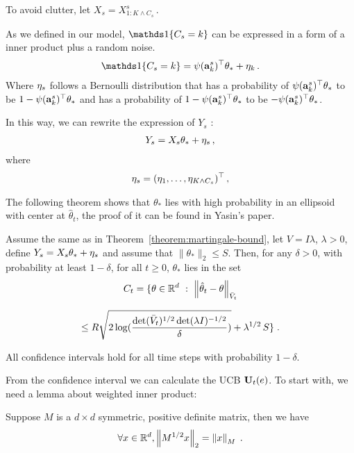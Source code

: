 To avoid clutter, let $X_s = X^s_{1 : K \wedge C_s}\,.$

As we defined in our model, $\I{C_s=k}$ can be expressed in a form of a inner product plus a random noise.
\begin{align*}
  \I{C_s=k} = \psi(\rnd{a}^s_k)^\top \theta_* + \rnd{\eta}_k \,.
\end{align*}
Where $ \mathbf{\eta}_s $ follows a Bernoulli distribution that
has a probability of $\psi(\mathbf{a}^s_k)^\top \theta_*$ to be $1 - \psi(\mathbf{a}^s_k)^\top \theta_*$
and has a probability of $1 - \psi(\mathbf{a}^s_k)^\top \theta_*$ to be $-\psi(\mathbf{a}^s_k)^\top \theta_*$.

In this way, we can rewrite the expression of $Y_s$ :
\begin{align*}
  Y_s = X_s \theta_* + \mathbf{\eta}_s \,,
\end{align*}
where
\begin{align*}
  \mathbf{\eta}_s = (\mathbf{\eta}_1, \dots, \mathbf{\eta}_{K \wedge C_s})^\top \,,
\end{align*}

The following theorem shows that $\theta_*$ lies with high probability in an
ellipsoid with center at $\hat{\theta}_t$, the proof of it can be found in Yasin's paper.

\begin{theorem}
\label{theorem:confidence-ellipsoid}
Assume the same as in Theorem~\ref{theorem:martingale-bound}, let $V = I \lambda$, $\lambda > 0$, define
$Y_s = X_s \theta_* + \mathbf{\eta}_s$ and assume that $\|\theta_*\|_2 \le S$. Then, for any $\delta > 0$, with probability at least $1-\delta$,
for all $t \ge 0$, $\theta_*$ lies in the set
$$
C_t = \{ \theta \in \mathbb{R}^d ~:~ \left\|\hat{\theta}_t -  \theta\right\|_{\bar{V}_{t}}
$$

$$
\le R \sqrt{2 \log( \frac{\det (\bar{V}_{t})^{1/2}\det(\lambda I)^{-1/2}}{\delta} )} + \lambda^{1/2}\, S \} \; .
$$

All confidence intervals hold for all time steps with probability $1-\delta$.

\end{theorem}

From the confidence interval we can calculate the UCB $\mathbf{U}_t(e)$.
To start with, we need a lemma about weighted inner product:
\begin{lemma}
\label{lemma:Weighted-Inner-Product}
Suppose $M$ is a $d \times d$ symmetric, positive definite matrix, then we have
\begin{align*}
  \forall x \in \mathbb{R}^d , \left\|M^{1/2} x\right\|_2 = \left\|x\right\|_M \; .
\end{align*}
\end{lemma}

